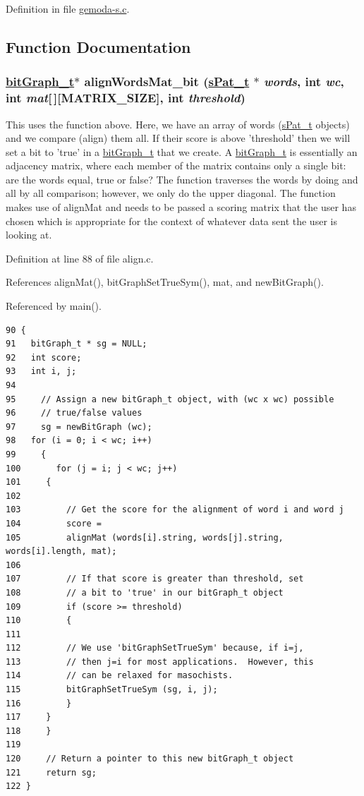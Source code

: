 Definition in file \hyperlink{gemoda-s_8c-source}{gemoda-s.c}.

\subsection*{Function Documentation}
\hypertarget{gemoda-s_8c_a3}{
\subsubsection[alignWordsMat\_\-bit]{\setlength{\rightskip}{0pt plus 5cm}\hyperlink{structbitGraph__t}{bit\-Graph\_\-t}$\ast$ align\-Words\-Mat\_\-bit (\hyperlink{structsPat__t}{s\-Pat\_\-t} $\ast$ {\em words}, int {\em wc}, int {\em mat}\mbox{[}$\,$\mbox{]}\mbox{[}MATRIX\_\-SIZE\mbox{]}, int {\em threshold})}}
\label{gemoda-s_8c_a3}


This uses the function above. Here, we have an array of words (\hyperlink{structsPat__t}{s\-Pat\_\-t} objects) and we compare (align) them all. If their score is above 'threshold' then we will set a bit to 'true' in a \hyperlink{structbitGraph__t}{bit\-Graph\_\-t} that we create. A \hyperlink{structbitGraph__t}{bit\-Graph\_\-t} is essentially an adjacency matrix, where each member of the matrix contains only a single bit: are the words equal, true or false? The function traverses the words by doing and all by all comparison; however, we only do the upper diagonal. The function makes use of align\-Mat and needs to be passed a scoring matrix that the user has chosen which is appropriate for the context of whatever data sent the user is looking at.

Definition at line 88 of file align.c.

References align\-Mat(), bit\-Graph\-Set\-True\-Sym(), mat, and new\-Bit\-Graph().

Referenced by main().

\scriptsize\begin{verbatim}90 {
91   bitGraph_t * sg = NULL;
92   int score;
93   int i, j;
94   
95     // Assign a new bitGraph_t object, with (wc x wc) possible
96     // true/false values
97     sg = newBitGraph (wc);
98   for (i = 0; i < wc; i++)
99     {
100       for (j = i; j < wc; j++)
101     {
102       
103         // Get the score for the alignment of word i and word j
104         score =
105         alignMat (words[i].string, words[j].string, words[i].length, mat);
106       
107         // If that score is greater than threshold, set
108         // a bit to 'true' in our bitGraph_t object
109         if (score >= threshold)
110         {
111           
112         // We use 'bitGraphSetTrueSym' because, if i=j,
113         // then j=i for most applications.  However, this
114         // can be relaxed for masochists.
115         bitGraphSetTrueSym (sg, i, j);
116         }
117     }
118     }
119   
120     // Return a pointer to this new bitGraph_t object
121     return sg;
122 }
\end{verbatim}
\normalsize 



